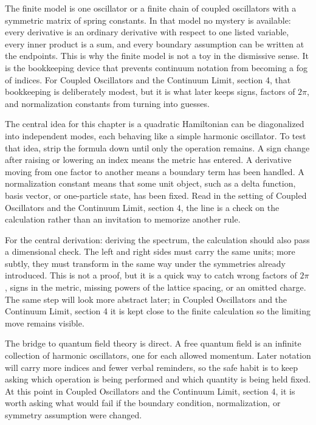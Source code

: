 The finite model is one oscillator or a finite chain of coupled oscillators with a symmetric matrix of spring constants.  In that model no mystery is available: every derivative is an ordinary derivative with respect to one listed variable, every inner product is a sum, and every boundary assumption can be written at the endpoints.  This is why the finite model is not a toy in the dismissive sense.  It is the bookkeeping device that prevents continuum notation from becoming a fog of indices.  For Coupled Oscillators and the Continuum Limit, section 4, that bookkeeping is deliberately modest, but it is what later keeps signs, factors of \(2\pi\), and normalization constants from turning into guesses.

The central idea for this chapter is a quadratic Hamiltonian can be diagonalized into independent modes, each behaving like a simple harmonic oscillator.  To test that idea, strip the formula down until only the operation remains.  A sign change after raising or lowering an index means the metric has entered.  A derivative moving from one factor to another means a boundary term has been handled.  A normalization constant means that some unit object, such as a delta function, basis vector, or one-particle state, has been fixed.  Read in the setting of Coupled Oscillators and the Continuum Limit, section 4, the line is a check on the calculation rather than an invitation to memorize another rule.

For the central derivation: deriving the spectrum, the calculation should also pass a dimensional check.  The left and right sides must carry the same units; more subtly, they must transform in the same way under the symmetries already introduced.  This is not a proof, but it is a quick way to catch wrong factors of \(2\pi\), signs in the metric, missing powers of the lattice spacing, or an omitted charge.  The same step will look more abstract later; in Coupled Oscillators and the Continuum Limit, section 4 it is kept close to the finite calculation so the limiting move remains visible.

The bridge to quantum field theory is direct.  A free quantum field is an infinite collection of harmonic oscillators, one for each allowed momentum.  Later notation will carry more indices and fewer verbal reminders, so the safe habit is to keep asking which operation is being performed and which quantity is being held fixed.  At this point in Coupled Oscillators and the Continuum Limit, section 4, it is worth asking what would fail if the boundary condition, normalization, or symmetry assumption were changed.

